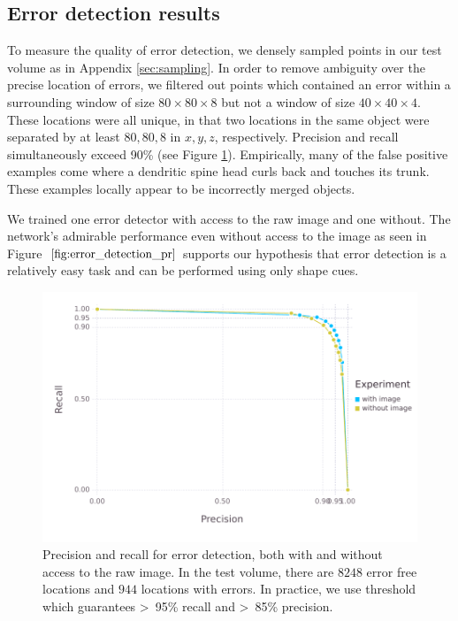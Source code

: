 \documentclass{article}
\begin{document}
\subsection{Error detection results}
\label{sec:detection_results}
To measure the quality of error detection, we densely sampled points in our test volume as in Appendix \ref{sec:sampling}. In order to remove ambiguity over the precise location of errors, we filtered out points which contained an error within a surrounding window of size $80\times80\times 8$ but not a window of size $40\times 40 \times 4$. These locations were all unique, in that two locations in the same object were separated by at least $80,80,8$ in $x,y,z$, respectively. Precision and recall simultaneously exceed 90\% (see Figure \ref{fig:error_detection_pr}). Empirically, many of the false positive examples come where a dendritic spine head curls back and touches its trunk. These examples locally appear to be incorrectly merged objects.

We trained one error detector with access to the raw image and one without. The network's admirable performance even without access to the image as seen in Figure~$\ref{fig:error_detection_pr}$ supports our hypothesis that error detection is a relatively easy task and can be performed using only shape cues.

\begin{figure}
\begin{center}
	\includegraphics[width=0.65\linewidth]{pr.pdf}
	\caption{Precision and recall for error detection, both with and without access to the raw image. In the test volume, there are $8248$ error free locations and $944$ locations with errors. In practice, we use threshold which guarantees >~95\% recall and >~85\% precision.}
	\label{fig:error_detection_pr}
\end{center}
\end{figure}
\end{document}

